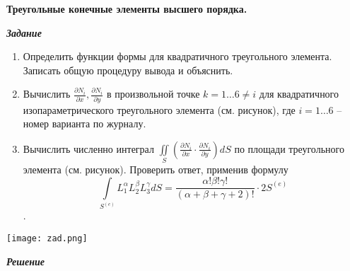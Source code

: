 \documentclass[a4paper, 12pt]{article}
\begin{document}
\begin{center}
\textbf{Треугольные конечные элементы высшего порядка.}
\end{center}
\begin{center}
\textbf{\textit{Задание}}
\end{center}

\begin{enumerate}
    \item Определить функции формы для квадратичного треугольного элемента. Записать общую процедуру вывода и объяснить.
    \item Вычислить \(\displaystyle \frac{\partial N_i}{\partial x}, \frac{\partial N_i}{\partial y}\) в произвольной точке $k = 1 \dots 6 \neq i$ для квадратичного изопараметрического треугольного элемента (см. рисунок), где $i = 1 \dots 6$ – номер варианта по журналу.
    \item Вычислить численно интеграл \(\displaystyle \iint \limits_S \left ( \frac{\partial N_i}{\partial x} \cdot \frac{\partial N_i}{\partial y} \right ) dS\) по площади треугольного элемента (см. рисунок). Проверить ответ, применив формулу 
    \[\displaystyle \int \limits_{S^{(e)}} L_1^{\alpha} L_2^{\beta} L_3^{\gamma} dS = \frac{\alpha! \beta! \gamma!}{(\alpha + \beta + \gamma + 2)!} \cdot 2S^{(e)}\].
\end{enumerate}

\begin{center}
    \texttt{[image: zad.png]}
\end{center}


\begin{center}
    \textbf{\textit{Решение}}
\end{center}
\end{document}
